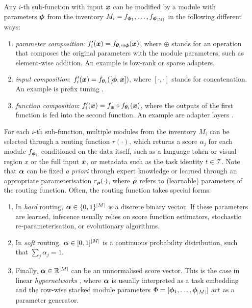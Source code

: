 \documentclass[10pt]{article} %
\begin{document}
Any $i$-th sub-function with input ${\bm{x}}$ can be modified by a module with parameters ${\bm{\phi}}$ from the inventory $M_i = f_{{\bm{\phi}}_1}, \dots, f_{{\bm{\phi}}_{|M|}}$ in the following different ways:

\begin{enumerate}
    \item \textit{parameter composition}: $f_i^\prime({\bm{x}}) = f_{{\bm{\theta}}_i \oplus {\bm{\phi}}}({\bm{x}})$, where $\oplus$ stands for an operation that composes the original parameters with the module parameters, such as element-wise addition. An example is low-rank \citep{hu2021lora} or sparse \citep{ansell2021composable} adapters.
    \item \textit{input composition}: $f_i^\prime({\bm{x}}) = f_{{\bm{\theta}}_i}([{\bm{\phi}}, {\bm{x}}])$, where $[\cdot, \cdot]$ stands for concatenation. An example is prefix tuning \cite{Li2020PrefixTuning}.
    \item \textit{function composition}: $f_i^\prime({\bm{x}}) =  f_{{\bm{\phi}}} \circ f_{{\bm{\theta}}_i} ({\bm{x}})$, where the outputs of the first function is fed into the second function. An example are adapter layers \citep{Rebuffi2017Adapters1}.
\end{enumerate}

For each $i$-th sub-function, multiple modules from the inventory $M_i$ can be selected through a routing function $r(\cdot)$, which returns a score $\alpha_j$ for each module $f_{{\bm{\phi}}_j}$ conditioned on the data itself, such as a language token or visual region $x$ or the full input ${\bm{x}}$, or metadata such as the task identity $t \in \mathcal{T}$. Note that ${\bm{\alpha}}$ can be fixed \textit{a priori} through expert knowledge or learned through an appropriate parameterisation $r_{\bm{\rho}}(\cdot)$, where ${\bm{\rho}}$ refers to (learnable) parameters of the routing function. Often, the routing function takes special forms: 
\begin{enumerate}
    \item In \textit{hard} routing, ${\bm{\alpha}} \in \{0, 1\}^{|M|}$ is a discrete binary vector. If these parameters are learned, inference usually relies on score function estimators, stochastic re-parameterisation, or evolutionary algorithms.
    \item In \textit{soft} routing, ${\bm{\alpha}} \in [0, 1]^{|M|}$ is a continuous probability distribution, such that $\sum_j \alpha_j = 1$.
    \item Finally, ${\bm{\alpha}} \in \mathbb{R}^{|M|}$ can be an unnormalised score vector. This is the case in linear \textit{hypernetworks} \citep{Ha2017HyperNetworks}, where ${\bm{\alpha}}$ is usually interpreted as a task embedding and the row-wise stacked module parameters $\Phi = [{\bm{\phi}}_1, \dots, {\bm{\phi}}_{|M|}]$ act as a parameter generator.
\end{enumerate}
\end{document}
